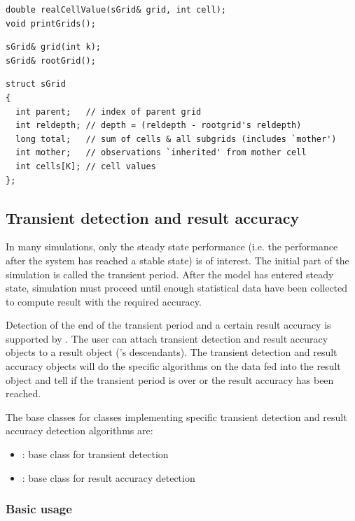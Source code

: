\begin{verbatim}
double realCellValue(sGrid& grid, int cell);
void printGrids();
\end{verbatim}

\begin{verbatim}
sGrid& grid(int k);
sGrid& rootGrid();
\end{verbatim}

\begin{verbatim}
struct sGrid
{
  int parent;   // index of parent grid
  int reldepth; // depth = (reldepth - rootgrid's reldepth)
  long total;   // sum of cells & all subgrids (includes `mother')
  int mother;   // observations `inherited' from mother cell
  int cells[K]; // cell values
};
\end{verbatim}



\subsection{Transient detection and result accuracy}

In many simulations, only the steady state performance (i.e.
the performance after the system has reached a stable state)
is of interest. The initial part of the simulation is called
the transient period. After the model has entered steady state,
simulation must proceed until enough statistical data have been
collected to compute result with the required accuracy.


Detection of the end of the transient period and a certain result
accuracy is supported by {\opp}. The user can attach transient
detection and result accuracy objects to a result object ('s
descendants). The transient detection and result accuracy objects will
do the specific algorithms on the data fed into the result object and
tell if the transient period is over or the result accuracy has been
reached.

The base classes for classes implementing specific transient
detection and result accuracy detection algorithms are:
\begin{itemize}
\item{: base class for transient detection}
\item{: base class for result accuracy detection}
\end{itemize}


\subsubsection{Basic usage}

